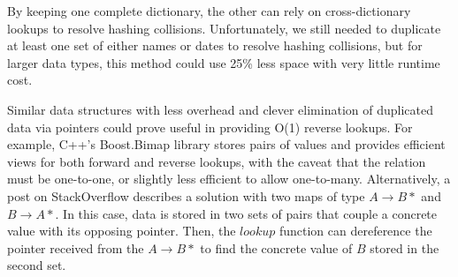 \documentclass{article}
\begin{document}
By keeping one complete dictionary, the other can rely on cross-dictionary lookups to resolve hashing collisions. Unfortunately, we still needed to duplicate at least one set of either names or dates to resolve hashing collisions, but for larger data types, this method could use 25\% less space with very little runtime cost.

Similar data structures with less overhead and clever elimination of duplicated data via pointers could prove useful in providing O(1) reverse lookups. For example, C++'s Boost.Bimap library \cite{boostBimap1, boostBimap2} stores pairs of values and provides efficient views for both forward and reverse lookups, with the caveat that the relation must be one-to-one, or slightly less efficient to allow one-to-many. Alternatively, a post on StackOverflow \cite{bimapStackOverflow} describes a solution with two maps of type $A \rightarrow B*$ and $B \rightarrow A*$. In this case, data is stored in two sets of pairs that couple a concrete value with its opposing pointer. Then, the $lookup$ function can dereference the pointer received from the $A \rightarrow B*$ to find the concrete value of $B$ stored in the second set.








\end{document}
